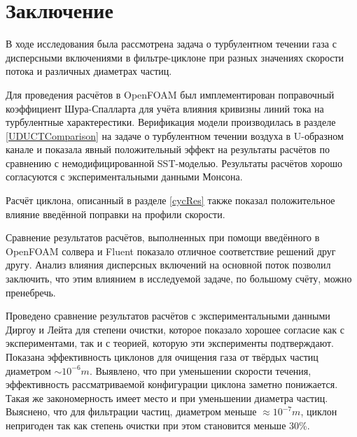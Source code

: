 \section*{Заключение}

В ходе исследования была рассмотрена задача о турбулентном течении газа с дисперсными включениями в фильтре-циклоне при разных значениях скорости потока и различных диаметрах частиц.

Для проведения расчётов в OpenFOAM был имплементирован поправочный коэффициент Шура-Спалларта для учёта влияния кривизны линий тока на турбулентные характерестики. Верификация модели производилась в разделе \ref{UDUCTComparison} на задаче о турбулентном течении воздуха в U-образном канале и показала явный положительный эффект на результаты расчётов по сравнению с немодифицированной SST-моделью. Результаты расчётов хорошо согласуются с экспериментальными данными Монсона.

Расчёт циклона, описанный в разделе \ref{cycRes} также показал положительное влияние введённой поправки на профили скорости. 

Сравнение результатов расчётов, выполненных при помощи введённого в OpenFOAM солвера и Fluent показало отличное соответствие решений друг другу. Анализ влияния дисперсных включений на основной поток позволил заключить, что этим влиянием в исследуемой задаче, по большому счёту, можно пренебречь.

Проведено сравнение результатов расчётов с экспериментальными данными Диргоу и Лейта для степени очистки, которое показало хорошее согласие как с экспериментами, так и с теорией, которую эти эксперименты подтверждают. Показана эффективность циклонов для очищения газа от твёрдых частиц диаметром $\sim 10^{-6}m$. Выявлено, что при уменьшении скорости течения, эффективность рассматриваемой конфигурации циклона заметно понижается. Такая же закономерность имеет место и при уменьшении диаметра частиц. Выяснено, что для фильтрации частиц, диаметром меньше $\approx 10^{-7}m$, циклон непригоден так как степень очистки при этом становится меньше 30\%.